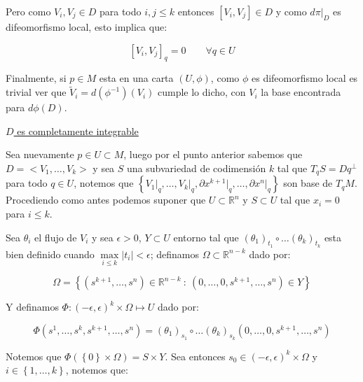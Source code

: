 \documentclass[11pt]{article}
\newcommand{\R}{{\mathbb{R}}}
\newcommand\tq{~:~}
\newcommand{\abs}[1]{\left\lvert#1\right\rvert}
\newcommand{\sett}[1]{\left\lbrace#1\right\rbrace}
\numberwithin{theorem}{subsection}
\newenvironment{proof}[1][Demostraci\'on]{\begin{trivlist}
		\item[\hskip \labelsep {\bfseries #1}]}{\end{trivlist}}
\newenvironment{definition}[1][Definici\'on]{\begin{trivlist}
		\item[\hskip \labelsep {\bfseries #1}]}{\end{trivlist}}
\begin{document}
\begin{proof}
\begin{definition}
\begin{proof}
			Pero como $V_i,V_j \in D$ para todo $i,j \leq k$ entonces $\left[V_i, V_j\right] \in D$ y como $d \pi \vert_{D}$ es difeomorfismo local, esto implica que:
			
			\begin{equation*}
				\left[V_i, V_j\right] _q = 0 \qquad \forall q \in U
			\end{equation*}
			
			Finalmente, si $p \in M$ esta en una carta $(U, \phi)$, como $\phi$ es difeomorfismo local es trivial ver que $\tilde{V}_i = d\left(\phi^{-1}\right)\left(V_i\right)$ cumple lo dicho, con $V_i$ la base encontrada para $d\phi(D)$.
			
			\medbreak
			\underline{$D$ es completamente integrable}
			\medbreak
			
			Sea nuevamente $p \in U \subset M$, luego por el punto anterior sabemos que $D = <V_1, \dots, V_k>$ y sea $S$ una subvariedad de codimensi\'on $k$ tal que $T_qS = Dq^{\perp}$ para todo $q \in U$, notemos que $\sett{V_1 \vert_{q}, \dots, V_k \vert_q, \partial x^{k+1} \vert_q, \dots, \partial x^{n} \vert_q}$ son base de $T_qM$. Procediendo como antes podemos suponer que $U \subset \R^n$ y $S \subset U$ tal que $x_i = 0$ para $i \leq k$.
			
			Sea $\theta_i$ el flujo de $V_i$ y sea $\epsilon > 0$, $Y \subset U$ entorno tal que $(\theta_1)_{t_1} \circ \dots (\theta_k)_{t_k}$ esta bien definido cuando $\max\limits_{i \leq k} {\abs{t_i}} < \epsilon$; definamos $\Omega \subset \R^{n-k}$ dado por:
			
			$$\Omega = \sett{(s^{k+1}, \dots, s^n) \in \R^{n-k} \tq (0, \dots, 0, s^{k+1}, \dots, s^n) \in Y}$$
			
			Y definamos $\Phi: (-\epsilon, \epsilon)^k \times \Omega \mapsto U$ dado por:
			
			$$\Phi(s^1, \dots, s^k, s^{k+1}, \dots, s^n) = (\theta_1)_{s_1} \circ \dots (\theta_k)_{s_k} (0, \dots, 0, s^{k+1}, \dots, s^n) $$
			
			Notemos que $\Phi\left(\sett{0} \times \Omega \right) = S \times Y$. Sea entonces $s_0 \in (-\epsilon, \epsilon)^k \times \Omega $ y $i \in \sett{1, \dots, k}$, notemos que:
			

\end{proof}
\end{definition}
\end{proof}
\end{document}
